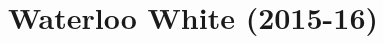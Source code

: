 \documentclass[10pt]{article}
\title{\vspace{-7ex}\Large{Waterloo White (2015-16)}}
\author{}
\date{}
\begin{document}
    
\begin{landscape}
\begin{multicols}{2}

\pagestyle{fancy}
\maketitle


\vspace{-16ex}
\tableofcontents

\end{multicols}
\end{landscape}
\end{document}
